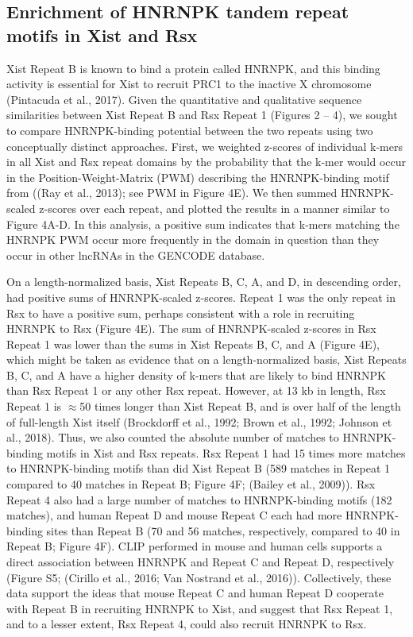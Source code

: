 \subsection{Enrichment of HNRNPK tandem repeat motifs in Xist and Rsx}
Xist Repeat B is known to bind a protein called HNRNPK, and this binding activity is essential for Xist to recruit PRC1 to the inactive X chromosome (Pintacuda et al., 2017). Given the quantitative and qualitative sequence similarities between Xist Repeat B and Rsx Repeat 1 (Figures 2 – 4), we sought to compare HNRNPK-binding potential between the two repeats using two conceptually distinct approaches. First, we weighted z-scores of individual k-mers in all Xist and Rsx repeat domains by the probability that the k-mer would occur in the Position-Weight-Matrix (PWM) describing the HNRNPK-binding motif from ((Ray et al., 2013); see PWM in Figure 4E). We then summed HNRNPK-scaled z-scores over each repeat, and plotted the results in a manner similar to Figure 4A-D. In this analysis, a positive sum indicates that k-mers matching the HNRNPK PWM occur more frequently in the domain in question than they occur in other lncRNAs in the GENCODE database.

On a length-normalized basis, Xist Repeats B, C, A, and D, in descending order, had positive sums of HNRNPK-scaled z-scores. Repeat 1 was the only repeat in Rsx to have a positive sum, perhaps consistent with a role in recruiting HNRNPK to Rsx (Figure 4E). The sum of HNRNPK-scaled z-scores in Rsx Repeat 1 was lower than the sums in Xist Repeats B, C, and A (Figure 4E), which might be taken as evidence that on a length-normalized basis, Xist Repeats B, C, and A have a higher density of k-mers that are likely to bind HNRNPK than Rsx Repeat 1 or any other Rsx repeat. However, at 13 kb in length, Rsx Repeat 1 is $\approx$50 times longer than Xist Repeat B, and is over half of the length of full-length Xist itself (Brockdorff et al., 1992; Brown et al., 1992; Johnson et al., 2018). Thus, we also counted the absolute number of matches to HNRNPK-binding motifs in Xist and Rsx repeats. Rsx Repeat 1 had 15 times more matches to HNRNPK-binding motifs than did Xist Repeat B (589 matches in Repeat 1 compared to 40 matches in Repeat B; Figure 4F; (Bailey et al., 2009)). Rsx Repeat 4 also had a large number of matches to HNRNPK-binding motifs (182 matches), and human Repeat D and mouse Repeat C each had more HNRNPK-binding sites than Repeat B (70 and 56 matches, respectively, compared to 40 in Repeat B; Figure 4F). CLIP performed in mouse and human cells supports a direct association between HNRNPK and Repeat C and Repeat D, respectively (Figure S5; (Cirillo et al., 2016; Van Nostrand et al., 2016)). Collectively, these data support the ideas that mouse Repeat C and human Repeat D cooperate with Repeat B in recruiting HNRNPK to Xist, and suggest that Rsx Repeat 1, and to a lesser extent, Rsx Repeat 4, could also recruit HNRNPK to Rsx. 

